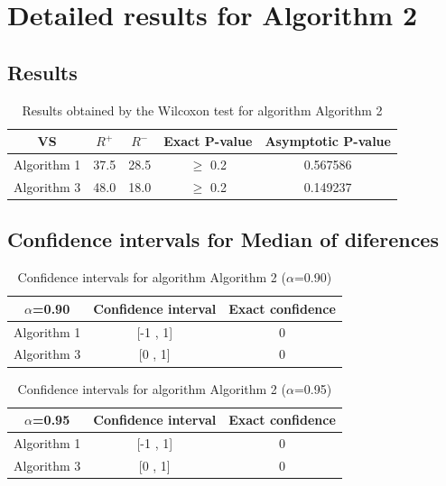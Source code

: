 \documentclass[a4paper,10pt]{article}
\begin{document}
 \clearpage 


\section{Detailed results for Algorithm 2}


\subsection{Results}

\begin{table}[!htp]
\centering\small
\begin{tabular}{
|c|c|c|c|c|}
\hline
 VS & $R^{+}$ & $R^{-}$ & Exact P-value & Asymptotic P-value \\ \hline 
Algorithm 1 & 37.5 & 28.5 & $\geq$ 0.2 & 0.567586\\ \hline 
Algorithm 3 & 48.0 & 18.0 & $\geq$ 0.2 & 0.149237\\ \hline 

\end{tabular}
\caption{Results obtained by the Wilcoxon test for algorithm Algorithm 2}
\end{table}

\subsection{Confidence intervals for Median of diferences}

\begin{table}[!htp]
\centering\small
\begin{tabular}{
|c|c|c|}
\hline
 $\alpha$=0.90 & Confidence interval & Exact confidence \\ \hline 
Algorithm 1 & [-1 , 1] & 0\\ \hline 
Algorithm 3 & [0 , 1] & 0\\ \hline 

\end{tabular}
\caption{Confidence intervals for algorithm Algorithm 2 ($\alpha$=0.90)}
\end{table}
\begin{table}[!htp]
\centering\small
\begin{tabular}{
|c|c|c|}
\hline
 $\alpha$=0.95 & Confidence interval & Exact confidence \\ \hline 
Algorithm 1 & [-1 , 1] & 0\\ \hline 
Algorithm 3 & [0 , 1] & 0\\ \hline 

\end{tabular}
\caption{Confidence intervals for algorithm Algorithm 2 ($\alpha$=0.95)}
\end{table}
\end{document}
